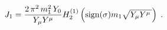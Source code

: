 \begin{equation}
J_1 = 
\frac{2 \, \pi^2  \, m_1^2\, Y_0  }{Y_\mu Y^\mu }
H_2^{(1)} \left( {\rm sign}(\sigma) m_1 \sqrt{Y_\mu Y^\mu \,} \right) \;.
\label{J_1fim}
\end{equation}

